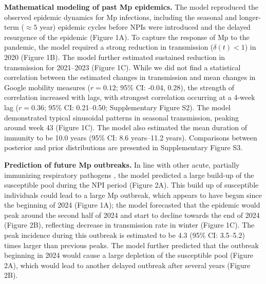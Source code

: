 \documentclass[12pt]{article}
\begin{document}
\textbf{Mathematical modeling of past Mp epidemics.}
The model reproduced the observed epidemic dynamics for Mp infections, including the seasonal and longer-term ($\approx 5$ year) epidemic cycles before NPIs were introduced and the delayed resurgence of the epidemic (Figure 1A).
To capture the response of Mp to the pandemic, the model required a strong reduction in transmission ($\delta(t) < 1$) in 2020 (Figure 1B).
The model further estimated sustained reduction in transmission for 2021--2023 (Figure 1C).
While we did not find a statistical correlation between the estimated changes in transmission and mean changes in Google mobility measures ($r=0.12$; 95\% CI: -0.04, 0.28),
the strength of correlation increased with lags, with strongest correlation occurring at a 4-week lag  ($r=0.36$; 95\% CI: 0.21--0.50; Supplementary Figure S2).
The model demonstrated typical sinusoidal patterns in seasonal transmission, peaking around week 43 (Figure 1C).
The model also estimated the mean duration of immunity to be 10.0 years (95\% CI: 8.6 years--11.2 years).
Comparisons between posterior and prior distributions are presented in Supplementary Figure S3.


\textbf{Prediction of future Mp outbreaks.}
In line with other acute, partially immunizing respiratory pathogens \citep{baker2020impact}, the model predicted a large build-up of the susceptible pool during the NPI period (Figure 2A).
This build up of susceptible individuals could lead to a large Mp outbreak, which appears to have begun since the beginning of 2024 (Figure 1A);
the model forecasted that the epidemic would peak around the second half of 2024 and start to decline towards the end of 2024 (Figure 2B), reflecting decrease in transmission rate in winter (Figure 1C).
The peak incidence during this outbreak is estimated to be 4.3 (95\% CI: 3.5--5.2) times larger than previous peaks.
The model further predicted that the outbreak beginning in 2024 would cause a large depletion of the susceptible pool (Figure 2A), which would lead to another delayed outbreak after several years (Figure 2B).
\end{document}
